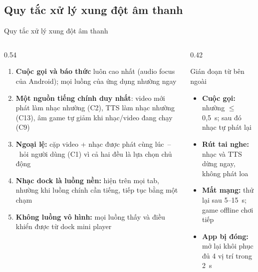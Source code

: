 \subsection{Quy tắc xử lý xung đột âm thanh}
\begin{frame}{Quy tắc xử lý xung đột âm thanh}
\begin{columns}[T]
\begin{column}{0.54\textwidth}
\footnotesize
\begin{enumerate}\setlength{\itemsep}{4pt}
\item \textbf{Cuộc gọi và báo thức} luôn cao nhất (audio focus của Android); mọi luồng của ứng dụng nhường ngay
\item \textbf{Một nguồn tiếng chính duy nhất}: video mới phát làm nhạc nhường (C2), TTS làm nhạc nhường (C13), âm game tự giảm khi nhạc/video đang chạy (C9)
\item \textbf{Ngoại lệ:} cặp video + nhạc được phát cùng lúc~--~hỏi người dùng (C1) vì cả hai đều là lựa chọn chủ động
\item \textbf{Nhạc dock là luồng nền:} hiện trên mọi tab, nhường khi luồng chính cần tiếng, tiếp tục bằng một chạm
\item \textbf{Không luồng vô hình:} mọi luồng thấy và điều khiển được từ dock mini player
\end{enumerate}
\end{column}
\begin{column}{0.42\textwidth}
\begin{block}{Gián đoạn từ bên ngoài}
{\footnotesize
\begin{itemize}\setlength{\itemsep}{2pt}
\item \textbf{Cuộc gọi:} nhường $\leq$ 0,5~s; sau đó nhạc tự phát lại
\item \textbf{Rút tai nghe:} nhạc và TTS dừng ngay, không phát loa
\item \textbf{Mất mạng:} thử lại sau 5--15~s; game offline chơi tiếp
\item \textbf{App bị đóng:} mở lại khôi phục đủ 4 vị trí trong 2~s
\end{itemize}}
\end{block}
\end{column}
\end{columns}
\end{frame}

